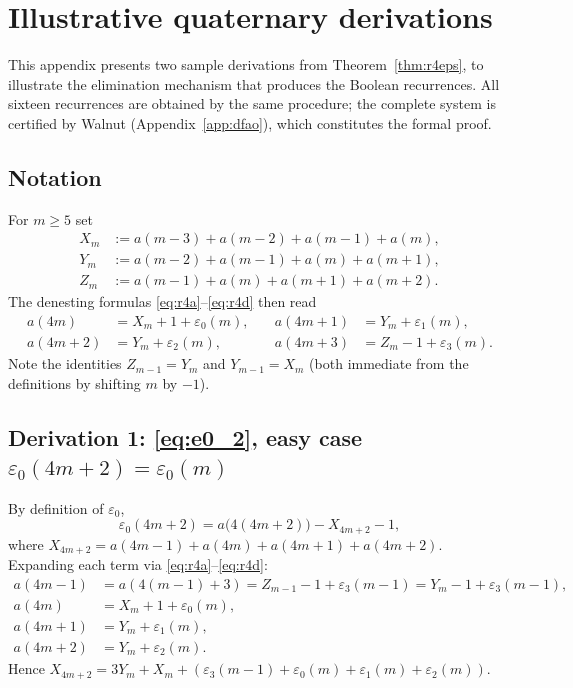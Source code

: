 \documentclass[12pt]{article}
\theoremstyle{definition}
\theoremstyle{remark}
\begin{document}
\section{Illustrative quaternary derivations}\label{app:r4-deriv}

This appendix presents two sample derivations from
Theorem~\ref{thm:r4eps}, to illustrate the elimination mechanism
that produces the Boolean recurrences.
All sixteen recurrences are obtained by the same procedure; the
complete system is certified by Walnut (Appendix~\ref{app:dfao}),
which constitutes the formal proof.

\subsection*{Notation}
For $m\ge 5$ set
\begin{align*}
  X_m &:= a(m-3)+a(m-2)+a(m-1)+a(m),\\
  Y_m &:= a(m-2)+a(m-1)+a(m)+a(m+1),\\
  Z_m &:= a(m-1)+a(m)+a(m+1)+a(m+2).
\end{align*}
The denesting formulas \eqref{eq:r4a}--\eqref{eq:r4d} then read
\begin{align*}
  a(4m)   &= X_m+1+\varepsilon_0(m), &\quad
  a(4m+1) &= Y_m+\varepsilon_1(m),\\
  a(4m+2) &= Y_m+\varepsilon_2(m), &\quad
  a(4m+3) &= Z_m-1+\varepsilon_3(m).
\end{align*}
Note the identities $Z_{m-1}=Y_m$ and $Y_{m-1}=X_m$ (both immediate from
the definitions by shifting $m$ by $-1$).

\subsection*{Derivation 1: \eqref{eq:e0_2}, easy case $\varepsilon_0(4m+2)=\varepsilon_0(m)$}

By definition of $\varepsilon_0$,
\[
  \varepsilon_0(4m+2) = a\bigl(4(4m+2)\bigr) - X_{4m+2} - 1,
\]
where $X_{4m+2} = a(4m-1)+a(4m)+a(4m+1)+a(4m+2)$.
Expanding each term via \eqref{eq:r4a}--\eqref{eq:r4d}:
\begin{align*}
  a(4m-1) &= a(4(m-1)+3) = Z_{m-1}-1+\varepsilon_3(m-1) = Y_m-1+\varepsilon_3(m-1),\\
  a(4m)   &= X_m+1+\varepsilon_0(m),\\
  a(4m+1) &= Y_m+\varepsilon_1(m),\\
  a(4m+2) &= Y_m+\varepsilon_2(m).
\end{align*}
Hence $X_{4m+2} = 3Y_m+X_m + (\varepsilon_3(m-1)+\varepsilon_0(m)+\varepsilon_1(m)+\varepsilon_2(m))$.
\end{document}
